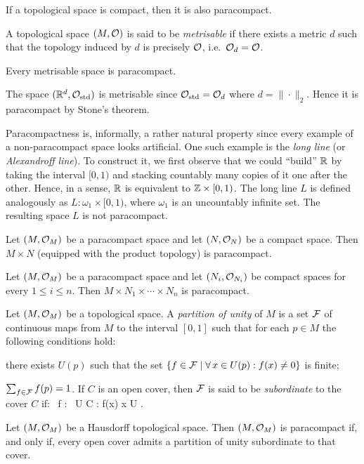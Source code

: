 \bc
If a topological space is compact, then it is also paracompact.
\ec

\bd
A topological space $(M,\mathcal{O})$ is said to be \emph{metrisable} if there exists a metric $d$ such that the topology induced by $d$ is precisely $\mathcal{O}$, i.e.\ $\mathcal{O}_d=\mathcal{O}$. 
\ed

\bt[Stone]
Every metrisable space is paracompact.
\et

\be
The space $(\mathbb{R}^d,\mathcal{O}_\mathrm{std})$ is metrisable since $\mathcal{O}_\mathrm{std}=\mathcal{O}_d$ where $d = \|\cdot\|_2$. Hence it is paracompact by Stone's theorem.
\ee

\br
Paracompactness is, informally, a rather natural property since every example of a non-paracompact space looks artificial. One such example is the \emph{long line} (or \emph{Alexandroff line}). To construct it, we first observe that we could ``build'' $\mathbb{R}$ by taking the interval $[0,1)$ and stacking countably many copies of it one after the other. Hence, in a sense, $\mathbb{R}$ is equivalent to $\mathbb{Z} \times [0,1)$. The long line $L$ is defined analogously as $L:\omega_1\times [0,1)$, where $\omega_1$ is an uncountably infinite set. The resulting space $L$ is not paracompact.
\er

\bt
Let $(M,\mathcal{O}_M)$ be a paracompact space and let $(N,\mathcal{O}_N)$ be a compact space. Then $M\times N$ (equipped with the product topology) is paracompact.
\et

\bc
Let $(M,\mathcal{O}_M)$ be a paracompact space and let $(N_i,\mathcal{O}_{N_i})$ be compact spaces for every $1\leq i \leq n$. Then $M\times N_1\times\cdots\times N_n$ is paracompact.
\ec

\bd
Let $(M,\mathcal{O}_M)$ be a topological space. A \emph{partition of unity}  of $M$ is a set $\mathcal{F}$ of continuous maps from $M$ to the interval $[0,1]$ such that for each $p\in M$ the following conditions hold:
\ben
\item[i)] there exists $U(p)$ such that the set $\{f \in \mathcal{F} \mid \forall \, x \in U(p):f(x)\neq 0\}$ is finite;
\item[ii)] $\sum_{f\in \mathcal{F}}f(p)=1$.
\een
If $C$ is an open cover, then $\mathcal{F}$ is said to be \emph{subordinate} to the cover $C$ if:
\bse
\forall \, f \in \cF : \exists \, U \in C : f(x)  \imp x \in U .
\ese
\ed

\bt
Let $(M,\mathcal{O}_M)$ be a Hausdorff topological space. Then $(M,\mathcal{O}_M)$ is paracompact if, and only if, every open cover admits a partition of unity subordinate to that cover.
\et

